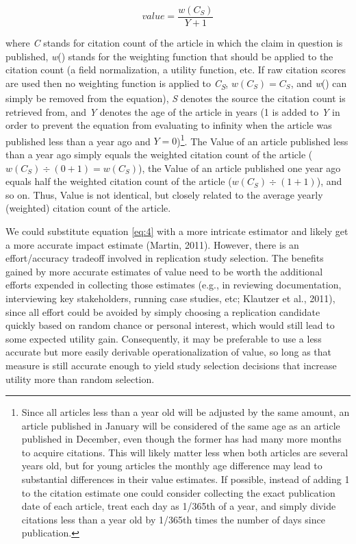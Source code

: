 \documentclass[
  english,
  jou,floatsintext]{apa6}
\begin{document}
\begin{equation} 
  \tag{4}
  value=\frac{w(C_{S})}{Y+1}
  \label{eq:4}
\end{equation}

where \emph{C} stands for citation count of the article in which the claim in question is published, \emph{w}() stands for the weighting function that should be applied to the citation count (a field normalization, a utility function, etc. If raw citation scores are used then no weighting function is applied to \emph{C\textsubscript{S}}, \(w(C_{S}) = C_{S}\), and \emph{w}() can simply be removed from the equation), \emph{S} denotes the source the citation count is retrieved from, and \emph{Y} denotes the age of the article in years (1 is added to \emph{Y} in order to prevent the equation from evaluating to infinity when the article was published less than a year ago and \(Y=0\))\footnote{Since all articles less than a year old will be adjusted by the same amount, an article published in January will be considered of the same age as an article published in December, even though the former has had many more months to acquire citations. This will likely matter less when both articles are several years old, but for young articles the monthly age difference may lead to substantial differences in their value estimates. If possible, instead of adding 1 to the citation estimate one could consider collecting the exact publication date of each article, treat each day as 1/365th of a year, and simply divide citations less than a year old by 1/365th times the number of days since publication.}. The Value of an article published less than a year ago simply equals the weighted citation count of the article (\(w(C_{S}) \div (0+1)=w(C_{S})\)), the Value of an article published one year ago equals half the weighted citation count of the article (\(w(C_{S})\div(1+1)\)), and so on. Thus, Value is not identical, but closely related to the average yearly (weighted) citation count of the article.

We could substitute equation \eqref{eq:4} with a more intricate estimator and likely get a more accurate impact estimate (Martin, 2011). However, there is an effort/accuracy tradeoff involved in replication study selection. The benefits gained by more accurate estimates of value need to be worth the additional efforts expended in collecting those estimates (e.g., in reviewing documentation, interviewing key stakeholders, running case studies, etc; Klautzer et al., 2011), since all effort could be avoided by simply choosing a replication candidate quickly based on random chance or personal interest, which would still lead to some expected utility gain. Consequently, it may be preferable to use a less accurate but more easily derivable operationalization of value, so long as that measure is still accurate enough to yield study selection decisions that increase utility more than random selection.
\end{document}
